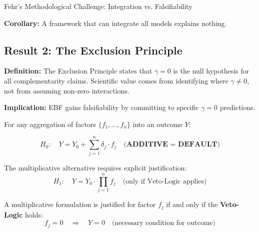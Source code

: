 \begin{chapter}{Fehr's Methodological Challenge: Integration vs. Falsifiability}
\begin{tcolorbox}[colback=gray!10!white,colframe=gray!75!black]
\textbf{Corollary:} A framework that can integrate all models explains nothing.
\end{tcolorbox}

\subsection{Result 2: The Exclusion Principle}
\label{sec:frm-exclusion-principle}

\begin{tcolorbox}[colback=gray!10!white,colframe=gray!75!black]
\textbf{Definition:} The Exclusion Principle states that $\gamma = 0$ is the null hypothesis for all complementarity claims. Scientific value comes from identifying where $\gamma \neq 0$, not from assuming non-zero interactions.

\textbf{Implication:} EBF gains falsifiability by committing to specific $\gamma = 0$ predictions.
\end{tcolorbox}


\begin{axiom}
\label{ax:exc-1}
For any aggregation of factors $\{f_1, \ldots, f_n\}$ into an outcome $Y$:

\begin{equation}
\boxed{
H_0: \quad Y = Y_0 + \sum_{j=1}^{n} \delta_j \cdot f_j \quad \textbf{(ADDITIVE = DEFAULT)}
}
\label{eq:exc-1-additive}
\end{equation}

The multiplicative alternative requires explicit justification:
\begin{equation}
H_1: \quad Y = Y_0 \cdot \prod_{j=1}^{n} f_j \quad \text{(only if Veto-Logic applies)}
\label{eq:exc-1-multiplicative}
\end{equation}
\end{axiom}

\begin{axiom}
\label{ax:exc-2}
A multiplicative formulation is justified for factor $f_j$ if and only if the \textbf{Veto-Logic} holds:
\begin{equation}
\boxed{
f_j = 0 \quad \Rightarrow \quad Y = 0 \quad \text{(necessary condition for outcome)}
}
\label{eq:exc-2-veto}
\end{equation}


\end{axiom}
\end{chapter}
